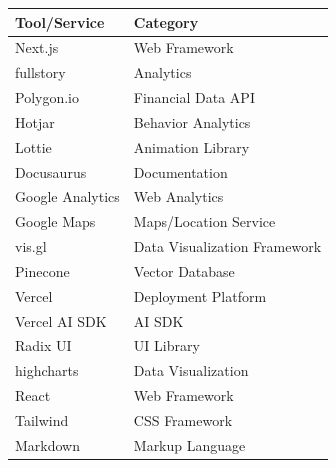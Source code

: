 \documentclass[
  letterpaper,
  DIV=11,
  numbers=noendperiod]{scrartcl}
\begin{document}
\begin{longtable}[]{@{}ll@{}}
\toprule\noalign{}
Tool/Service & Category \\
\midrule\noalign{}
\endhead
\bottomrule\noalign{}
\endlastfoot
Next.js & Web Framework \\
fullstory & Analytics \\
Polygon.io & Financial Data API \\
Hotjar & Behavior Analytics \\
Lottie & Animation Library \\
Docusaurus & Documentation \\
Google Analytics & Web Analytics \\
Google Maps & Maps/Location Service \\
vis.gl & Data Visualization Framework \\
Pinecone & Vector Database \\
Vercel & Deployment Platform \\
Vercel AI SDK & AI SDK \\
Radix UI & UI Library \\
highcharts & Data Visualization \\
React & Web Framework \\
Tailwind & CSS Framework \\
Markdown & Markup Language \\
\end{longtable}

\newpage
\end{document}
